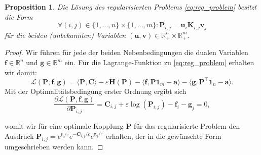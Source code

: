 \documentclass[twoside, 12pt,a4paper]{book}
\newtheorem{proposition}[theorem]{Proposition}
\numberwithin{equation}{section}
\begin{document}
	\begin{proposition}
		Die Lösung des regularisierten Problems \eqref{eq:reg_problem} besitzt die Form
		\begin{equation}
		\forall (i,j) \in \lbrace 1,...,n \rbrace \times \lbrace 1,...,m \rbrace : \boldsymbol{P}_{i,j} = \boldsymbol{u}_i \boldsymbol{K}_{i,j} \boldsymbol{v}_j \label{eq:reg_sol_factorized}
		\end{equation}
		für die beiden (unbekannten) Variablen $(\boldsymbol{u}, \boldsymbol{v}) \in \mathbb{R}_+^n \times \mathbb{R}_+^m.$
	\end{proposition}
	
	\begin{proof}
		Wir führen für jede der beiden Nebenbedingungen die dualen Variablen $\boldsymbol{f} \in \mathbb{R}^n$ und $\boldsymbol{g} \in \mathbb{R}^m$ ein. Für die Lagrange-Funktion zu \eqref{eq:reg_problem} erhalten wir damit:
		\begin{equation}
		\mathcal{L}(\boldsymbol{P}, \boldsymbol{f}, \boldsymbol{g}) = \langle \boldsymbol{P}, \boldsymbol{C} \rangle -\varepsilon \boldsymbol{H}(\boldsymbol{P}) - 
		\langle \boldsymbol{f}, \boldsymbol{P}\boldsymbol{1}_m - \boldsymbol{a} \rangle -
		\langle \boldsymbol{g}, \boldsymbol{P}^\top \boldsymbol{1}_n - \boldsymbol{a} \rangle. 
		\end{equation}
		\noindent Mit der Optimalitätsbedingung erster Ordnung ergibt sich
		\begin{equation}
		\frac{\partial \mathcal{L} (\boldsymbol{P}, \boldsymbol{f}, \boldsymbol{g})}{\partial \boldsymbol{P}_{i,j}} = \boldsymbol{C}_{i,j} + \varepsilon \log (\boldsymbol{P}_{i,j}) -\boldsymbol{f}_i - \boldsymbol{g}_j = 0,
		\end{equation}
		
		\noindent womit wir für eine optimale Kopplung $\boldsymbol{P}$ für das regularisierte Problem den Ausdruck $\boldsymbol{P}_{i,j} = e^{\boldsymbol{f}_i/\varepsilon}e^{-\boldsymbol{C}_{i,j}/\varepsilon}e^{\boldsymbol{g}_j/\varepsilon}$ erhalten, der in die gewünschte Form umgeschrieben werden kann.
	\end{proof}
	
	
	
\end{document}
